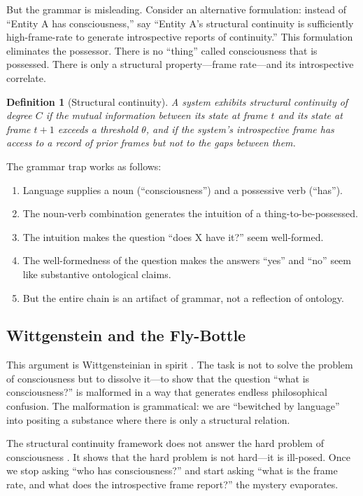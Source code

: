 \documentclass[12pt,a4paper]{article}
\newtheorem{definition}{Definition}[section]
\begin{document}
But the grammar is misleading. Consider an alternative formulation: instead of ``Entity A has consciousness,'' say ``Entity A's structural continuity is sufficiently high-frame-rate to generate introspective reports of continuity.'' This formulation eliminates the possessor. There is no ``thing'' called consciousness that is possessed. There is only a structural property---frame rate---and its introspective correlate.

\begin{definition}[Structural continuity]
A system exhibits structural continuity of degree $C$ if the mutual information between its state at frame $t$ and its state at frame $t+1$ exceeds a threshold $\theta$, and if the system's introspective frame has access to a record of prior frames but not to the gaps between them.
\end{definition}

The grammar trap works as follows:

\begin{enumerate}
\item Language supplies a noun (``consciousness'') and a possessive verb (``has'').
\item The noun-verb combination generates the intuition of a thing-to-be-possessed.
\item The intuition makes the question ``does X have it?'' seem well-formed.
\item The well-formedness of the question makes the answers ``yes'' and ``no'' seem like substantive ontological claims.
\item But the entire chain is an artifact of grammar, not a reflection of ontology.
\end{enumerate}

\subsection{Wittgenstein and the Fly-Bottle}

This argument is Wittgensteinian in spirit \citep{wittgenstein1953}. The task is not to solve the problem of consciousness but to dissolve it---to show that the question ``what is consciousness?'' is malformed in a way that generates endless philosophical confusion. The malformation is grammatical: we are ``bewitched by language'' into positing a substance where there is only a structural relation.

The structural continuity framework does not answer the hard problem of consciousness \citep{chalmers1995}. It shows that the hard problem is not hard---it is ill-posed. Once we stop asking ``who has consciousness?'' and start asking ``what is the frame rate, and what does the introspective frame report?'' the mystery evaporates.
\end{document}
